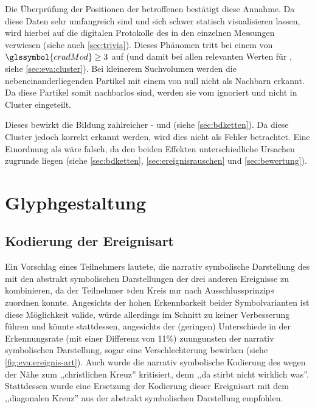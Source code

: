 Die Überprüfung der Positionen der betroffenen  bestätigt diese Annahme. Da diese Daten sehr umfangreich sind und sich schwer statisch visualisieren lassen, wird hierbei auf die digitalen Protokolle des \CFD in den einzelnen Messungen verwiesen (siehe auch \autoref{sec:trivia}). %
Dieses Phänomen tritt bei einem  von $\glssymbol{cradMod} \ge 3$ auf (und damit bei allen relevanten Werten für , siehe \autoref{sec:eva:cluster}). Bei kleinerem Suchvolumen werden die nebeneinanderliegenden Partikel mit einem  von null nicht als Nachbarn erkannt. Da diese Partikel somit nachbarlos sind, werden sie vom \CFD ignoriert und nicht in Cluster eingeteilt.

Dieses  bewirkt die Bildung zahlreicher - und  (siehe \autoref{sec:bdketten}). Da diese Cluster jedoch korrekt erkannt werden, wird dies nicht als Fehler betrachtet. Eine Einordnung als  wäre falsch, da den beiden Effekten unterschiedliche Ursachen zugrunde liegen (siehe \autoref{sec:bdketten}, \autoref{sec:ereignisrauschen} und \autoref{sec:bewertung}).

\section{Glyphgestaltung}
\subsection*{Kodierung der Ereignisart}
Ein Vorschlag eines Teilnehmers lautete, die narrativ symbolische Darstellung des  mit den abstrakt symbolischen Darstellungen der drei anderen Ereignisse zu kombinieren, da der Teilnehmer »den Kreis nur nach Ausschlussprinzip« zuordnen konnte. Angesichts der hohen Erkennbarkeit beider Symbolvarianten ist diese Möglichkeit valide, würde allerdings im Schnitt zu keiner Verbesserung führen und könnte stattdessen, angesichts der (geringen) Unterschiede in der Erkennungsrate (mit einer Differenz von 11\%) zuungunsten der narrativ symbolischen Darstellung, sogar eine Verschlechterung bewirken (siehe \autoref{fig:eva:ereignis-art}). Auch wurde die narrativ symbolische Kodierung des  wegen der Nähe zum ,,christlichen Kreuz'' kritisiert, denn ,,da stirbt nicht wirklich was''. Stattdessen wurde eine Ersetzung der Kodierung dieser Ereignisart mit dem ,,diagonalen Kreuz'' aus der abstrakt symbolischen Darstellung empfohlen.

